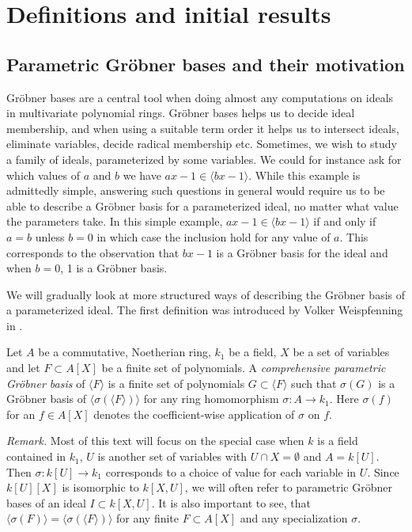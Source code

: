 \section{Definitions and initial results}

\subsection{Parametric Gröbner bases and their motivation}
Gröbner bases are a central tool when doing almost any computations on ideals in multivariate polynomial rings. Gröbner bases helps us to decide ideal membership, and when using a suitable term order it helps us to intersect ideals, eliminate variables, decide radical membership etc. Sometimes, we wish to study a family of ideals, parameterized by some variables. We could for instance ask for which values of $a$ and $b$ we have $ax - 1 \in \langle bx - 1 \rangle$. While this example is admittedly simple, answering such questions in general would require us to be able to describe a Gröbner basis for a parameterized ideal, no matter what value the parameters take. In this simple example, $ax - 1 \in \langle bx - 1 \rangle$ if and only if $a = b$ unless $b = 0$ in which case the inclusion hold for any value of $a$. This corresponds to the observation that $bx - 1$ is a Gröbner basis for the ideal and when $b=0$, 1 is a Gröbner basis.

We will gradually look at more structured ways of describing the Gröbner basis of a parameterized ideal. The first definition was introduced by Volker Weispfenning in \cite{Weispfenning}.

\begin{definition}\label{def:par_grb}
  Let $A$ be a commutative, Noetherian ring, $k_{1}$ be a field, $X$ be a set of variables and let $F \subset A[X]$ be a finite set of polynomials. A \textit{comprehensive parametric Gröbner basis} of $\langle F \rangle$ is a finite set of polynomials $G \subset \langle F \rangle$ such that $\sigma(G)$ is a Gröbner basis of $\langle \sigma(\langle F \rangle) \rangle$ for any ring homomorphism $\sigma : A \to k_{1}$. Here $\sigma(f)$ for an $f \in A[X]$ denotes the coefficient-wise application of $\sigma$ on $f$.
\end{definition}
\textit{Remark. }Most of this text will focus on the special case when $k$ is a field contained in $k_{1}$, $U$ is another set of variables with $U \cap X = \emptyset$ and $A = k[U]$. Then $\sigma : k[U] \to k_{1}$ corresponds to a choice of value for each variable in $U$. Since $k[U][X]$ is isomorphic to $k[X, U]$, we will often refer to parametric Gröbner bases of an ideal $I \subset k[X, U]$. It is also important to see, that $\langle \sigma(F) \rangle = \langle \sigma(\langle F \rangle) \rangle$ for any finite $F \subset A[X]$ and any specialization $\sigma$.

